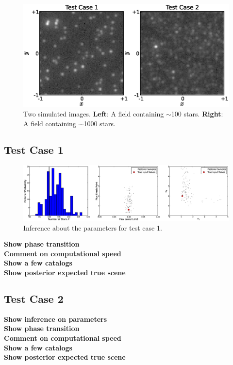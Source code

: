 \documentclass[letterpaper, 11pt]{article}
\begin{document}
\begin{figure}
\hspace{-1cm}
\includegraphics{Figures/test_cases.eps}
\caption{Two simulated images.
{\bf Left}: A field containing $\sim$100 stars.
{\bf Right}: A field containing $\sim$1000 stars.\label{fig:simulated_data}}
\end{figure}

\subsection{Test Case 1}

\begin{figure}
\begin{center}
\includegraphics[scale=0.33]{Figures/inference1.eps}
\end{center}
\caption{Inference about the parameters for test case 1.\label{fig:results1}}
\end{figure}

{\bf Show phase transition}\\
{\bf Comment on computational speed}\\
{\bf Show a few catalogs}\\
{\bf Show posterior expected true scene}\\

\subsection{Test Case 2}
{\bf Show inference on parameters}\\
{\bf Show phase transition}\\
{\bf Comment on computational speed}\\
{\bf Show a few catalogs}\\
{\bf Show posterior expected true scene}\\
\end{document}

